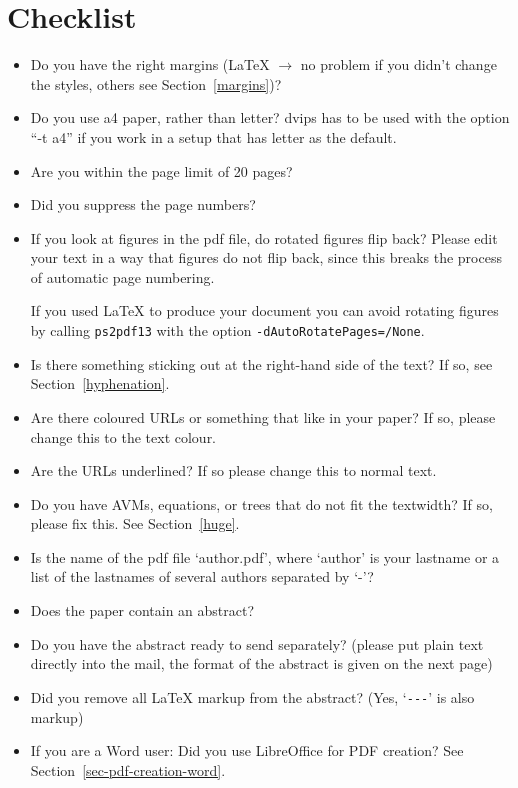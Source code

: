 \documentclass[11pt,a4paper,fleqn]{article}
\begin{document}
\section{Checklist}

\begin{itemize}
\item Do you have the right margins (\LaTeX{} $\to$ no problem if you didn't change
      the styles, others see Section~\ref{margins})?
\item Do you use a4 paper, rather than letter? dvips has to be used with the option ``-t a4'' if you
  work in a setup that has letter as the default.
\item Are you within the page limit of 20 pages?
\item Did you suppress the page numbers?
\item If you look at figures in the pdf file, do rotated figures flip back?
      Please edit your text in a way that figures do not flip back, since this
      breaks the process of automatic page numbering.

If you used \LaTeX{} to produce your document you can avoid rotating figures by calling
\verb+ps2pdf13+ with the option \verb+-dAutoRotatePages=/None+.
\item Is there something sticking out at the right-hand side of the text?
      If so, see Section~\ref{hyphenation}.
\item Are there coloured URLs or something that like in your paper? If so,
      please change this to the text colour.
\item Are the URLs underlined? If so please change this to normal text.
\item Do you have AVMs, equations, or trees that do not fit the textwidth?
      If so, please fix this. See Section~\ref{huge}.
\item Is the name of the pdf file `author.pdf', where `author' is your lastname or a list of the lastnames of several authors
      separated by `-'?
\item Does the paper contain an abstract?
\item Do you have the abstract ready to send separately? (please put plain text directly into the mail, the
format of the abstract is given on the next page)
\item Did you remove all \LaTeX{} markup from the abstract? (Yes, `\verb+---+' is also markup)
\item If you are a Word user: Did you use LibreOffice for PDF creation? See Section~\ref{sec-pdf-creation-word}.
\end{itemize}
\end{document}
